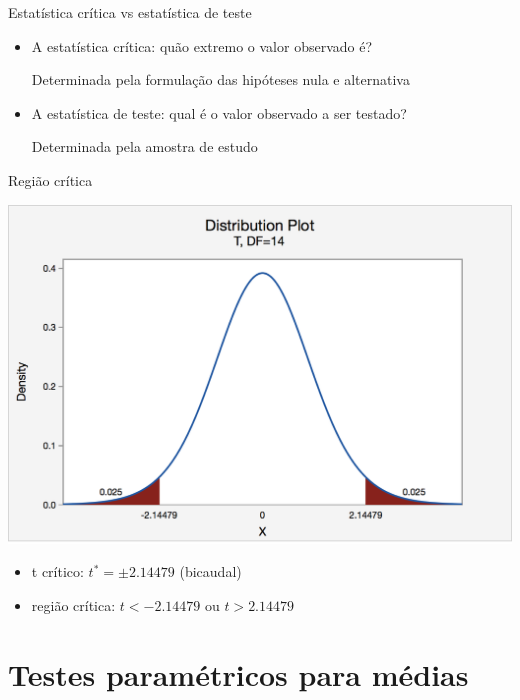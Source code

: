 \documentclass{beamer}
\begin{document}
\begin{frame}{\scriptsize Estatística crítica vs estatística de teste}
  \begin{itemize}
    \footnotesize
  \item A estatística crítica: quão extremo o valor observado é?

    \smallskip
    {\tiny Determinada pela formulação das hipóteses nula e alternativa}

    \bigskip
  \item A estatística de teste: qual é o valor observado a ser testado?

    \smallskip
    {\tiny Determinada pela amostra de estudo}
  \end{itemize}
\end{frame}

\begin{frame}{\scriptsize Região crítica}
  \begin{center}
    \includegraphics[width=.8\textwidth]{Cap23-25/s-3-1_ex_two_tail}
  \end{center}

  \begin{itemize}
    \tiny
  \item t crítico: $t^{*} = \pm 2.14479$ (bicaudal)
  \item região crítica: $t < -2.14479$ ou $t > 2.14479$
  \end{itemize}
\end{frame}

\section{Testes paramétricos para médias}
\end{document}
